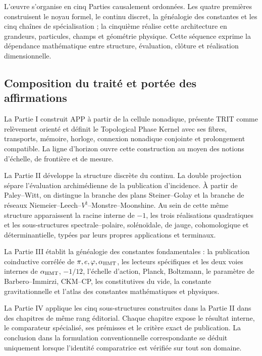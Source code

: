 L'œuvre s'organise en cinq Parties causalement ordonnées. Les quatre
premières construisent le noyau formel, le continu discret, la généalogie des
constantes et les cinq chaînes de spécialisation ; la cinquième réalise cette architecture
en grandeurs, particules, champs et géométrie physique. Cette séquence exprime
la dépendance mathématique entre structure, évaluation, clôture et
réalisation dimensionnelle.

\subsection*{Composition du traité et portée des affirmations}

La Partie I construit APP à partir de la cellule nonadique, présente TRIT comme
relèvement orienté et définit le Topological Phase Kernel avec ses fibres,
transports, mémoire, horloge, connexion nonadique conjointe et prolongement
compatible. La ligne d'horizon ouvre cette construction au moyen des
notions d'échelle, de frontière et de mesure.

La Partie II développe la structure discrète du continu. La double
projection sépare l'évaluation archimédienne de la publication d'incidence.
À partir de Paley--Witt, on distingue la branche des plans Steiner--Golay et la branche
de réseaux Niemeier--Leech--\(V^\natural\)--Monstre--Moonshine. Au sein de cette même structure
apparaissent la racine interne de \(-1\), les trois réalisations quadratiques et les
sous-structures spectrale--polaire, solénoïdale, de jauge, cohomologique et
déterminantielle, typées par leurs propres applications et terminaux.

La Partie III établit la généalogie des constantes fondamentales : la
publication coinductive corrélée de
\(\pi,e,\varphi,\alpha_{\rm HMT}\), les lecteurs spécifiques et les deux voies
internes de \(\alpha_{\rm HMT}\), \(-1/12\), l'échelle d'action, Planck,
Boltzmann, le paramètre de Barbero--Immirzi, CKM--CP, les constitutives du
vide, la constante gravitationnelle et l'atlas des constantes mathématiques et
physiques.

La Partie IV applique les cinq sous-structures construites dans la Partie II dans des
chapitres de même rang éditorial. Chaque chapitre expose le résultat
interne, le comparateur spécialisé, ses prémisses et le critère exact de
publication. La conclusion dans la formulation conventionnelle correspondante se
déduit uniquement lorsque l'identité comparatrice est vérifiée sur tout son
domaine.

